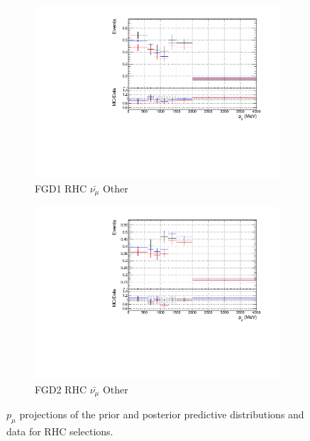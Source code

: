 \begin{figure}[!htbp]
\begin{subfigure}{0.49\textwidth}
  \centering
  \includegraphics[width=\textwidth]{figs/priorpred1D_p_FGD1_anti-numuCC_other}
  \caption{FGD1 RHC $\bar{\nu_{\mu}}$ Other}
\end{subfigure}
\begin{subfigure}{0.49\textwidth}
  \centering
  \includegraphics[width=\textwidth]{figs/priorpred1D_p_FGD2_anti-numuCC_other}
  \caption{FGD2 RHC $\bar{\nu_{\mu}}$ Other}
\end{subfigure}
\caption{$p_{\mu}$ projections of the prior and posterior predictive distributions and data for RHC \numub selections.}
\label{fig:priorpost_rhc_numub_p}
\end{figure}

